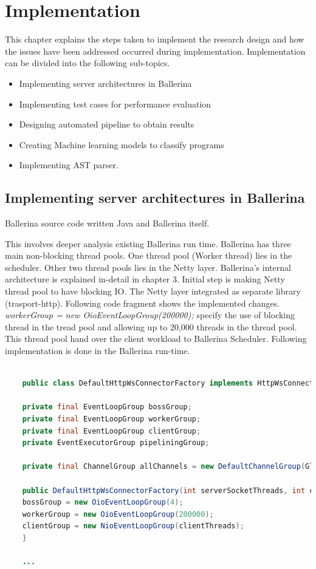 \chapter{Implementation} \label{chap:4}

This chapter explains the steps taken to implement the research design and how the issues have been addressed occurred during implementation. Implementation can be divided into the following sub-topics.


\begin{itemize}
	\item Implementing server architectures in Ballerina
	\item Implementing test cases for performance evaluation
	\item Designing automated pipeline to obtain results
	\item Creating Machine learning models to classify programs
	\item Implementing AST parser.
\end{itemize}

\section{Implementing server architectures in Ballerina}

Ballerina source code written Java and Ballerina itself.

This involves deeper analysis existing Ballerina run time. Ballerina has three main non-blocking thread pools. One thread pool (Worker thread) lies in the scheduler. Other two thread pools lies in the Netty layer. Ballerina's internal architecture is explained in-detail in chapter 3. Initial step is making Netty thread pool to have blocking IO.
The Netty layer integrated as separate library (trasport-http)\cite{transport-http}. Following code fragment shows the implemented changes.  \textit{workerGroup = new OioEventLoopGroup(200000);} specify the use of blocking thread in the tread pool and allowing up to 20,000 threads in the thread pool. This thread pool hand over the client workload to Ballerina Scheduler. Following implementation is done in the Ballerina run-time.

\begin{lstlisting}[language=Java]

	public class DefaultHttpWsConnectorFactory implements HttpWsConnectorFactory {
	
	private final EventLoopGroup bossGroup;
	private final EventLoopGroup workerGroup;
	private final EventLoopGroup clientGroup;
	private EventExecutorGroup pipeliningGroup;
	
	private final ChannelGroup allChannels = new DefaultChannelGroup(GlobalEventExecutor.INSTANCE);
	
	public DefaultHttpWsConnectorFactory(int serverSocketThreads, int childSocketThreads, int clientThreads) {
	bossGroup = new OioEventLoopGroup(4);
	workerGroup = new OioEventLoopGroup(200000);
	clientGroup = new NioEventLoopGroup(clientThreads);
	}
	
	...
\end{lstlisting}


